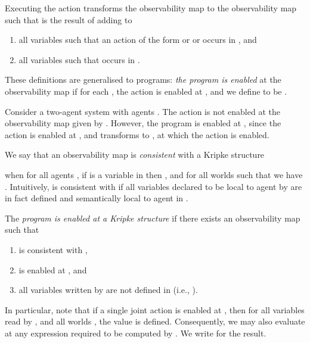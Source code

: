 \documentclass[]{llncs}
\newcommand{\be}{\begin{enumerate}}
\newcommand{\ee}{\end{enumerate}}
\begin{document}
Executing the action  transforms the  observability map 
to the  observability map   
such that  is  the result of adding to 
\be 
\item 
all variables   such that an action of the form  or  or   occurs in , and 
\item 
all variables    such that  
occurs in . 
\ee 
These definitions are  generalised to programs: 
{\em the program   is enabled}  at
the observability map   if for each , 
the action  is  enabled at , 
and we define  to be . 


\begin{example} 
Consider a two-agent system with agents . 
The action  is not enabled at the observability map  
given by . However, the 
program  is enabled at , 
since  the action  is enabled at , and 
transforms  to  ,
at  which the action  is enabled. 
\end{example} 

We say that an  observability map is {\em  consistent} with a Kripke  structure

when for all agents , if  is a variable in  then , and for 
 all worlds  such that 
we have . Intuitively,  is consistent with   if all 
variables declared to be local to agent  by  are in fact defined and  semantically 
local  to agent  in .

The {\em program  is enabled at a Kripke structure } if 
there exists an observability map  such that
\be 
\item   is consistent with , 
\item  is enabled at , and 
\item all variables   written by  are not defined in  (i.e., ). 
\ee 
In particular, note that if a single joint action  is enabled at , then 
for all variables  read by , and all worlds , the value  is
defined. Consequently, we may also evaluate at  any expression  
required to be computed  by . We write  for the result. 
\end{document}

